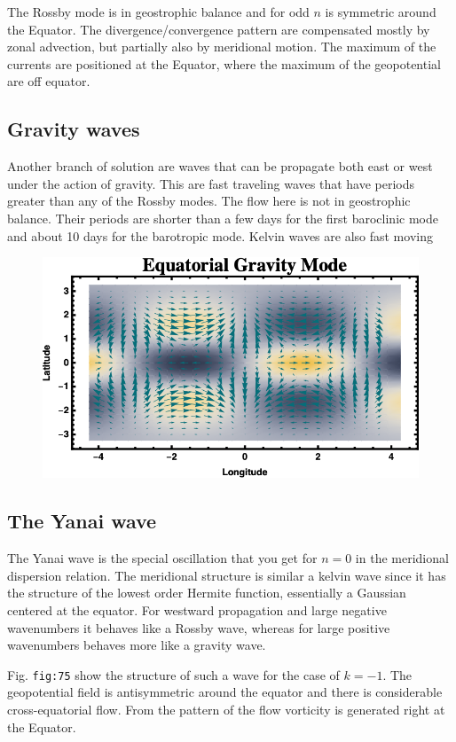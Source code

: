 The Rossby mode is in geostrophic balance and for odd \(n\) is symmetric
around the Equator. The divergence/convergence pattern are compensated
mostly by zonal advection, but partially also by meridional motion. The
maximum of the currents are positioned at the Equator, where the maximum
of the geopotential are off equator.

\subsection{Gravity waves}\label{gravity-waves}

Another branch of solution are waves that can be propagate both east or
west under the action of gravity. This are fast traveling waves that
have periods greater than any of the Rossby modes. The flow here is not
in geostrophic balance. Their periods are shorter than a few days for
the first baroclinic mode and about 10 days for the barotropic mode.
Kelvin waves are also fast moving

\begin{figure}
\centering
\includegraphics[width = .7 \textwidth]{figs/GD/GravityWave.png}
\caption{}
\end{figure}

\subsection{The Yanai wave}\label{the-yanai-wave}

The Yanai wave is the special oscillation that you get for \(n=0\) in
the meridional dispersion relation. The meridional structure is similar
a kelvin wave since it has the structure of the lowest order Hermite
function, essentially a Gaussian centered at the equator. For westward
propagation and large negative wavenumbers it behaves like a Rossby
wave, whereas for large positive wavenumbers behaves more like a gravity
wave.

Fig. \texttt{fig:75} show the structure of such a wave for the case of
\(k=-1\). The geopotential field is antisymmetric around the equator and
there is considerable cross-equatorial flow. From the pattern of the
flow vorticity is generated right at the Equator.

